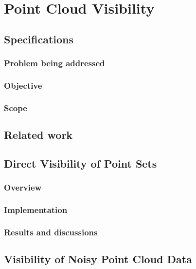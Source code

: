 \chapter{Point Cloud Visibility}
\label{ch:visibility}

\section{Specifications}


\subsection{Problem being addressed}


\subsection{Objective}


\subsection{Scope}



\section{Related work}



\section{Direct Visibility of Point Sets}


\subsection{Overview}


\subsection{Implementation}


\subsection{Results and discussions}



\section{Visibility of Noisy Point Cloud Data}



